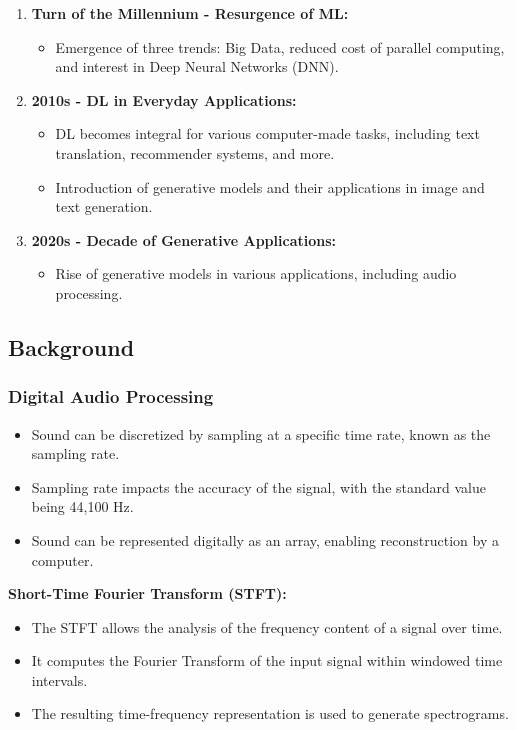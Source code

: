 \begin{frame}
{\begin{enumerate}
            \item \textbf{Turn of the Millennium - Resurgence of ML:}
                  \begin{itemize}
                      \item Emergence of three trends: Big Data, reduced cost of parallel computing, and interest in Deep Neural Networks (DNN).
                  \end{itemize}
    
            \item \textbf{2010s - DL in Everyday Applications:}
                  \begin{itemize}
                      \item DL becomes integral for various computer-made tasks, including text translation, recommender systems, and more.
                      \item Introduction of generative models and their applications in image and text generation.
                  \end{itemize}
    
            \item \textbf{2020s - Decade of Generative Applications:}
                  \begin{itemize}
                      \item Rise of generative models in various applications, including audio processing.
                  \end{itemize}
        \end{enumerate}
    }
\end{frame}


\subsection{Background}

\begin{frame}
    \frametitle{Digital Audio Processing}

    \begin{itemize}
        \item Sound can be discretized by sampling at a specific time rate, known as the sampling rate.
        \item Sampling rate impacts the accuracy of the signal, with the standard value being 44,100 Hz.
        \item Sound can be represented digitally as an array, enabling reconstruction by a computer.
    \end{itemize}

    \textbf{Short-Time Fourier Transform (STFT):}
    \begin{itemize}
        \item The STFT allows the analysis of the frequency content of a signal over time.
        \item It computes the Fourier Transform of the input signal within windowed time intervals.
        \item The resulting time-frequency representation is used to generate spectrograms.
    \end{itemize}
\end{frame}

